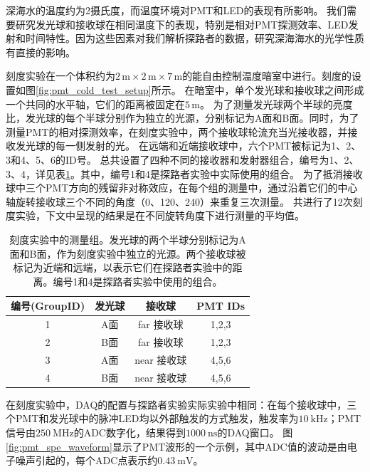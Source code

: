 深海水的温度约为2摄氏度，而温度环境对PMT和LED的表现有所影响。
我们需要研究发光球和接收球在相同温度下的表现，特别是相对PMT探测效率、LED发射和时间特性。因为这些因素对我们解析探路者的数据，研究深海海水的光学性质有直接的影响。

刻度实验在一个体积约为$2\,\text{m} \times 2\,\text{m} \times 7\,\text{m}$的能自由控制温度暗室中进行。刻度的设置如图\ref{fig:pmt_cold_test_setup}所示。
在暗室中，单个发光球和接收球之间形成一个共同的水平轴，它们的距离被固定在$5\,\text{m}$。
为了测量发光球两个半球的亮度比，发光球的每个半球分别作为独立的光源，分别标记为A面和B面。同时，为了测量PMT的相对探测效率，在刻度实验中，两个接收球轮流充当光接收器，并接收发光球的每一侧发射的光。
在远端和近端接收球中，六个PMT被标记为1、2、3和4、5、6的ID号。
总共设置了四种不同的接收器和发射器组合，编号为1、2、3、4，详见表\ref{tab:pmt_low_temp_exp_config}。其中，编号1和4是探路者实验中实际使用的组合。
为了抵消接收球中三个PMT方向的残留非对称效应，在每个组的测量中，通过沿着它们的中心轴旋转接收球三个不同的角度（0、120、240）来重复三次测量。
共进行了12次刻度实验，下文中呈现的结果是在不同旋转角度下进行测量的平均值。

\begin{table}[htb]
    \centering
    \begin{tabular}{|c|c|c|c|}
        \hline
        编号(GroupID) & 发光球 & 接收球 & PMT IDs\\
        \hline                            
        1  & A面 & far 接收球 & 1,2,3       \\
        2  & B面 & far 接收球 & 1,2,3   \\
        3  & A面 & near 接收球 & 4,5,6     \\
        4  & B面 & near 接收球 & 4,5,6    \\
        \hline
    \end{tabular}
    \caption{刻度实验中的测量组。发光球的两个半球分别标记为A面和B面，作为刻度实验中独立的光源。两个接收球被标记为近端和远端，以表示它们在探路者实验中的距离。编号1和4是探路者实验中使用的组合。}
    \label{tab:pmt_low_temp_exp_config}
\end{table}

在刻度实验中，DAQ的配置与探路者实验实际实验中相同：在每个接收球中，三个PMT和发光球中的脉冲LED均以外部触发的方式触发，触发率为$10~\mathrm{kHz}$；PMT信号由$250~\mathrm{MHz}$的ADC数字化，结果得到$1000~\mathrm{ns}$的DAQ窗口。
图\ref{fig:pmt_spe_waveform}显示了PMT波形的一个示例，其中ADC值的波动是由电子噪声引起的，每个ADC点表示约$0.43~\mathrm{mV}$。

